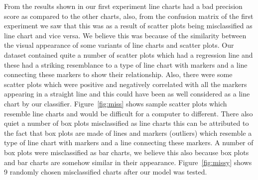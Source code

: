 \documentclass[12pt, a4paper,oneside]{report}
\begin{document}
From the results shown in our first experiment line charts had a bad precision score as compared to the other charts, also, from the confusion matrix of the first experiment we saw that this was as a result of scatter plots being misclassified as line chart and vice versa. We believe this was because of the similarity between the visual appearance of some variants of line charts and scatter plots. Our dataset contained quite a number of scatter plots which had a regression line and these had a striking resemblance to a type of line chart with markers and a line connecting these markers to show their relationship.
Also, there were some scatter plots which were positive and negatively correlated with all the markers appearing in a straight line and this could have been as well considered as a line chart by our classifier. Figure~\ref{fig:miss} shows sample scatter plots which resemble line charts and would be difficult for a computer to different. There also quiet a number of box plots misclassified as line charts this can be attributed to the fact that box plots are made of lines and markers (outliers) which resemble a type of line chart with markers and a line connecting these markers. A number of box plots were misclassified as bar charts, we believe this also because box plots and bar charts are somehow similar in their appearance.  Figure~\ref{fig:missy} shows 9 randomly chosen misclassified charts after our model was tested.
\end{document}
